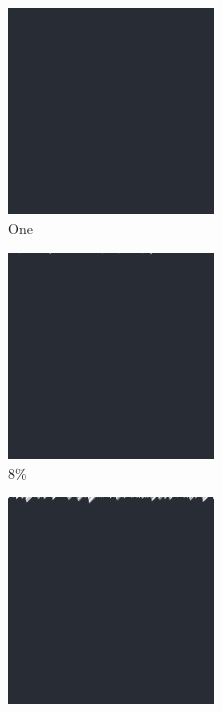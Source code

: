 \documentclass[12pt, fleqn]{report}                             %
\theoremstyle{break}                                            %
\begin{document}
      \begin{figure}[ht!]
        \centering
        \begin{subfigure}[b]{0.4\linewidth}
          \includegraphics[width=0.6\textwidth]{Images/168/a.png}
          \caption{One}
        \end{subfigure}
        \begin{subfigure}[b]{0.4\linewidth}
          \includegraphics[width=0.6\textwidth]{Images/168/b.png}
          \caption{8\%}
        \end{subfigure}
        \begin{subfigure}[b]{0.4\linewidth}
          \includegraphics[width=0.6\textwidth]{Images/168/c.png}

\end{subfigure}
\end{figure}
\end{document}
